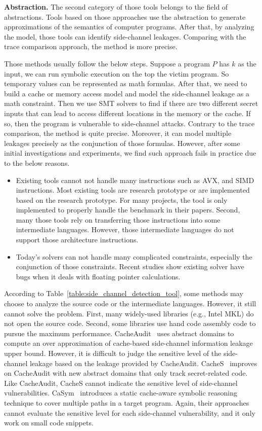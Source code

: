 \textbf{Abstraction.} The second category of those tools belongs to the field of abstractions. Tools based on those approaches use the abstraction to generate approximations of the semantics of computer programs. After that, by analyzing the model, those tools can identify side-channel leakages. Comparing with the trace comparison approach, the method is more precise. 

Those methods usually follow the below steps. Suppose a program $P$ has $k$ as the input, we can run symbolic execution on the top the victim program. So temporary values can be represented as math formulas. After that, we need to build a cache or memory access model and model the side-channel leakage as a math constraint. Then we use SMT solvers to find if there are two different secret inputs that can lead to access different locations in the memory or the cache. If so, then the program is vulnerable to side-channel attacks. Contrary to the trace comparison, the method is quite precise. Moreover, it can model multiple leakages precisely as the conjunction of those formulas. However, after some initial investigations and experiments, we find such approach fails in practice due to the below reasons. 

\begin{itemize}
    \item Existing tools cannot not handle many instructions such as AVX, and SIMD instructions.  Most existing tools are research prototype or are implemented based on the research prototype. For many projects, the tool is only implemented to properly handle the benchmark in their papers. Second, many those tools rely on transferring those instructions into some intermediate languages. However, those intermediate languages do not support those architecture instructions. 
    \item Today's solvers can not handle many complicated constraints, especially the conjunction of those constraints. Recent studies show existing solver have bugs when it deals with floating pointer calculations.
\end{itemize}

According to Table~\ref{table:side_channel_detection_tool}, some methods may choose to analyze the source code or the intermediate languages. However, it still cannot solve the problem. First, many widely-used libraries (e.g., Intel MKL) do not open the source code. Second, some libraries use hand code assembly code to pursue the maximum performance. CacheAudit~\cite{182946} uses abstract domains to compute an
over approximation of cache-based side-channel information leakage upper bound.
However, it is difficult to judge the sensitive level of the side-channel leakage based on
the leakage provided by CacheAudit. CacheS~\cite{236338} improves on
CacheAudit with new abstract domains that only track
secret-related code. Like CacheAudit, CacheS cannot
indicate the sensitive level of side-channel vulnerabilities.
CaSym~\cite{Brotzman19Casym} introduces a static cache-aware symbolic
reasoning technique to cover multiple paths in a target program. Again, their
approaches cannot evaluate the sensitive level for each side-channel
vulnerability, and it only work on small code snippets.


